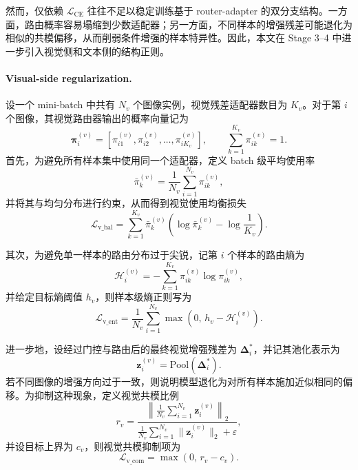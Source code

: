 \documentclass[journal]{IEEEtran}
\begin{document}
然而，仅依赖 $\mathcal{L}_{\mathrm{CE}}$ 往往不足以稳定训练基于 router-adapter 的双分支结构。一方面，路由概率容易塌缩到少数适配器；另一方面，不同样本的增强残差可能退化为相似的共模偏移，从而削弱条件增强的样本特异性。因此，本文在 Stage 3--4 中进一步引入视觉侧和文本侧的结构正则。

\paragraph{Visual-side regularization.}
设一个 mini-batch 中共有 $N_v$ 个图像实例，视觉残差适配器数目为 $K_v$。对于第 $i$ 个图像，其视觉路由器输出的概率向量记为
\begin{equation}
\boldsymbol{\pi}^{(v)}_i
=
\left[\pi^{(v)}_{i1},\pi^{(v)}_{i2},\ldots,\pi^{(v)}_{iK_v}\right],
\qquad
\sum_{k=1}^{K_v}\pi^{(v)}_{ik}=1.
\end{equation}
首先，为避免所有样本集中使用同一个适配器，定义 batch 级平均使用率
\begin{equation}
\bar{\pi}^{(v)}_{k}
=
\frac{1}{N_v}\sum_{i=1}^{N_v}\pi^{(v)}_{ik},
\end{equation}
并将其与均匀分布进行约束，从而得到视觉使用均衡损失
\begin{equation}
\mathcal{L}_{\mathrm{v\_bal}}
=
\sum_{k=1}^{K_v}
\bar{\pi}^{(v)}_{k}
\left(
\log \bar{\pi}^{(v)}_{k}
-
\log \frac{1}{K_v}
\right).
\end{equation}

其次，为避免单一样本的路由分布过于尖锐，记第 $i$ 个样本的路由熵为
\begin{equation}
\mathcal{H}^{(v)}_i
=
-
\sum_{k=1}^{K_v}
\pi^{(v)}_{ik}\log \pi^{(v)}_{ik},
\end{equation}
并给定目标熵阈值 $h_v$，则样本级熵正则写为
\begin{equation}
\mathcal{L}_{\mathrm{v\_ent}}
=
\frac{1}{N_v}
\sum_{i=1}^{N_v}
\max\!\left(0,\, h_v-\mathcal{H}^{(v)}_i\right).
\end{equation}

进一步地，设经过门控与路由后的最终视觉增强残差为 $\mathbf{\Delta}^{*}_i$，并记其池化表示为
\begin{equation}
\mathbf{z}^{(v)}_i=\mathrm{Pool}\!\left(\mathbf{\Delta}^{*}_i\right).
\end{equation}
若不同图像的增强方向过于一致，则说明模型退化为对所有样本施加近似相同的偏移。为抑制这种现象，定义视觉共模比例
\begin{equation}
r_v
=
\frac{
\left\|
\frac{1}{N_v}\sum_{i=1}^{N_v}\mathbf{z}^{(v)}_i
\right\|_2
}{
\frac{1}{N_v}\sum_{i=1}^{N_v}\|\mathbf{z}^{(v)}_i\|_2+\varepsilon
},
\end{equation}
并设目标上界为 $c_v$，则视觉共模抑制项为
\begin{equation}
\mathcal{L}_{\mathrm{v\_com}}
=
\max(0,\, r_v-c_v).
\end{equation}
\end{document}
